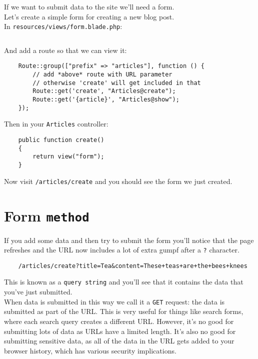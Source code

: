 If we want to submit data to the site we'll need a form.
\\

Let's create a simple form for creating a new blog post.
\\

In \texttt{resources/views/form.blade.php}:

\inputminted{php}{10-forms/figures/01-form.blade.php}

And add a route so that we can view it:

\begin{verbatim}
    Route::group(["prefix" => "articles"], function () {
        // add *above* route with URL parameter
        // otherwise 'create' will get included in that
        Route::get('create', "Articles@create");
        Route::get('{article}', "Articles@show");
    });
\end{verbatim}

Then in your \texttt{Articles} controller:

\begin{verbatim}
    public function create()
    {
        return view("form");
    }
\end{verbatim}

Now visit \texttt{/articles/create} and you should see the form we just created.

\section{Form \texttt{method}}

If you add some data and then try to submit the form you'll notice that the page refreshes and the URL now includes a lot of extra gumpf after a \texttt{?} character.

\begin{verbatim}
    /articles/create?title=Tea&content=These+teas+are+the+bees+knees
\end{verbatim}

This is known as a \texttt{query string} and you'll see that it contains the data that you've just submitted.
\\

When data is submitted in this way we call it a \texttt{GET} request: the data is submitted as part of the URL. This is very useful for things like search forms, where each search query creates a different URL. However, it's no good for submitting lots of data as URLs have a limited length. It's also no good for submitting sensitive data, as all of the data in the URL gets added to your browser history, which has various security implications.
\\

